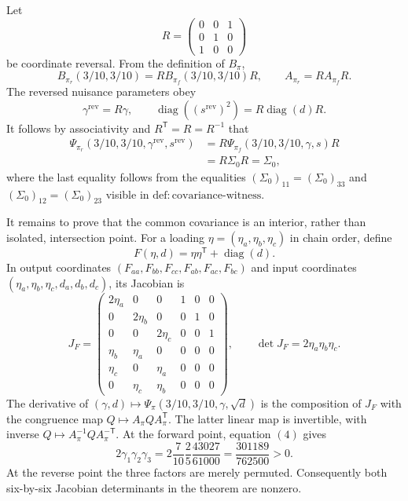 Let
\[
 R=\begin{pmatrix}0&0&1\\0&1&0\\1&0&0\end{pmatrix}
\]
be coordinate reversal.  From the definition of \(B_\pi\),
\[
 B_{\pi_r}(3/10,3/10)=RB_{\pi_f}(3/10,3/10)R,
 \qquad
 A_{\pi_r}=RA_{\pi_f}R.
\]
The reversed nuisance parameters obey
\[
 \gamma^{\mathrm{rev}}=R\gamma,
 \qquad
 \operatorname{diag}((s^{\mathrm{rev}})^2)
 =R\operatorname{diag}(d)R.
\]
It follows by associativity and \(R^{\mathsf T}=R=R^{-1}\) that
\[
 \begin{aligned}
 \Psi_{\pi_r}(3/10,3/10,\gamma^{\mathrm{rev}},s^{\mathrm{rev}})
 &=R\Psi_{\pi_f}(3/10,3/10,\gamma,s)R\\
 &=R\Sigma_0R
 =\Sigma_0,
 \end{aligned}
 \tag{3}
\]
where the last equality follows from the equalities \((\Sigma_0)_{11}=(\Sigma_0)_{33}\) and \((\Sigma_0)_{12}=(\Sigma_0)_{23}\) visible in \(\mathrm{def{:}covariance\text{-}witness}\).

It remains to prove that the common covariance is an interior, rather than isolated, intersection point.  For a loading \(\eta=(\eta_a,\eta_b,\eta_c)\) in chain order, define
\[
 F(\eta,d)=\eta\eta^{\mathsf T}+\operatorname{diag}(d).
\]
In output coordinates \((F_{aa},F_{bb},F_{cc},F_{ab},F_{ac},F_{bc})\) and input coordinates \((\eta_a,\eta_b,\eta_c,d_a,d_b,d_c)\), its Jacobian is
\[
 J_F=
 \begin{pmatrix}
 2\eta_a&0&0&1&0&0\\
 0&2\eta_b&0&0&1&0\\
 0&0&2\eta_c&0&0&1\\
 \eta_b&\eta_a&0&0&0&0\\
 \eta_c&0&\eta_a&0&0&0\\
 0&\eta_c&\eta_b&0&0&0
 \end{pmatrix},
 \qquad
 \det J_F=2\eta_a\eta_b\eta_c.
 \tag{4}
\]
The derivative of \((\gamma,d)\mapsto\Psi_\pi(3/10,3/10,\gamma,\sqrt d)\) is the composition of \(J_F\) with the congruence map \(Q\mapsto A_\pi Q A_\pi^{\mathsf T}\).  The latter linear map is invertible, with inverse \(Q\mapsto A_\pi^{-1}Q A_\pi^{-\mathsf T}\).  At the forward point, equation \((4)\) gives
\[
 2\gamma_1\gamma_2\gamma_3
 =2\frac7{10}\frac25\frac{43027}{61000}
 =\frac{301189}{762500}>0.
\]
At the reverse point the three factors are merely permuted.  Consequently both six-by-six Jacobian determinants in the theorem are nonzero.

